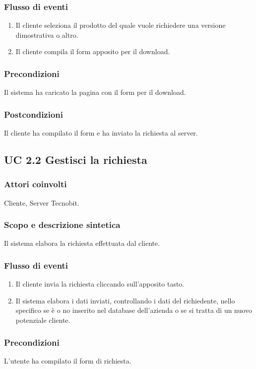 \subsubsection*{Flusso di eventi}
\begin{enumerate}
\item Il cliente seleziona il prodotto del quale vuole richiedere una versione dimostrativa o altro.
\item Il cliente compila il form apposito per il download.
\end{enumerate}
\subsubsection*{Precondizioni} Il sistema ha caricato la pagina con il form per il download.
\subsubsection*{Postcondizioni} Il cliente ha compilato il form e ha inviato la richiesta al server.

\subsection*{UC 2.2 Gestisci la richiesta}
\subsubsection*{Attori coinvolti} Cliente, Server Tecnobit.
\subsubsection*{Scopo e descrizione sintetica}
Il sistema elabora la richiesta effettuata dal cliente.
\subsubsection*{Flusso di eventi}
\begin{enumerate}
\item Il cliente invia la richiesta cliccando sull'apposito tasto.
\item Il sistema elabora i dati inviati, controllando i dati del richiedente, nello specifico se \`e o no inserito nel database dell'azienda o se si tratta di un nuovo potenziale cliente.
\end{enumerate}
\subsubsection*{Precondizioni} L'utente ha compilato il form di richiesta.
